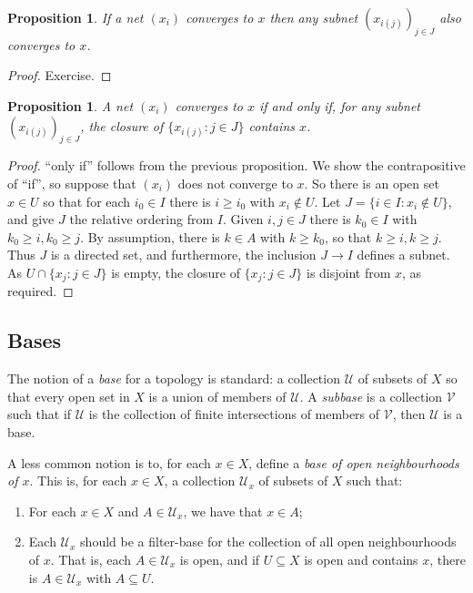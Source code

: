 \documentclass[a4paper,11pt]{article}
\newcommand{\mc}[1]{{\mathcal{#1}}}
\newtheorem{proposition}[lemma]{Proposition}
\begin{document}
\begin{proposition}
If a net $(x_i)$ converges to $x$ then any subnet $(x_{i(j)})_{j\in J}$
also converges to $x$.
\end{proposition}
\begin{proof}
Exercise.
\end{proof}

\begin{proposition}
A net $(x_i)$ converges to $x$ if and only if, for any subnet
$(x_{i(j)})_{j\in J}$, the closure of $\{ x_{i(j)} : j\in J \}$ contains $x$.
\end{proposition}
\begin{proof}
``only if'' follows from the previous proposition.  We show the contrapositive
of ``if'', so suppose that $(x_i)$ does not converge to $x$.  So there is an
open set $x\in U$ so that for each $i_0\in I$ there is $i\geq i_0$ with $x_i
\not\in U$.  Let $J = \{ i\in I : x_i\not\in U \}$, and give $J$ the relative
ordering from $I$.  Given $i,j\in J$ there is $k_0\in I$ with $k_0\geq i,
k_0\geq j$.  By assumption, there is $k\in A$ with $k\geq k_0$, so that $k\geq i,
k\geq j$.  Thus $J$ is a directed set, and furthermore, the inclusion
$J\rightarrow I$ defines a subnet.  As $U \cap \{ x_j : j\in J \}$ is empty,
the closure of $\{ x_j : j\in J \}$ is disjoint from $x$, as required.
\end{proof}

\subsection{Bases}

The notion of a \emph{base} for a topology is standard: a collection $\mc U$ of
subsets of $X$ so that every open set in $X$ is a union of members of $\mc U$.
A \emph{subbase} is a collection $\mc V$ such that if $\mc U$ is the collection
of finite intersections of members of $\mc V$, then $\mc U$ is a base.

A less common notion is to, for each $x\in X$, define a \emph{base of open
neighbourhoods of $x$}.  This is, for each $x\in X$, a collection $\mc U_x$ of
subsets of $X$ such that:
\begin{enumerate}
\item\label{defn:bon:one}
For each $x\in X$ and $A\in\mc U_x$, we have that $x\in A$;
\item\label{defn:bon:two}
Each $\mc U_x$ should be a filter-base for the collection of all open
neighbourhoods of $x$.  That is, each $A\in\mc U_x$ is open, 
and if $U\subseteq X$ is open and contains $x$,
there is $A\in \mc U_x$ with $A\subseteq U$.
\end{enumerate}
\end{document}
